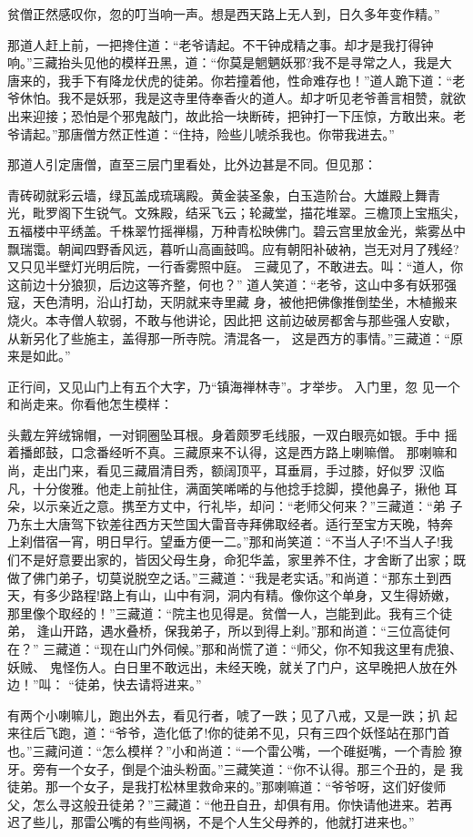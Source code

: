 贫僧正然感叹你，忽的叮当响一声。想是西天路上无人到，日久多年变作精。”

那道人赶上前，一把搀住道：“老爷请起。不干钟成精之事。却才是我打得钟
响。”三藏抬头见他的模样丑黑，道：“你莫是魍魉妖邪?我不是寻常之人，我是大
唐来的，我手下有降龙伏虎的徒弟。你若撞着他，性命难存也！”道人跪下道：“老
爷休怕。我不是妖邪，我是这寺里侍奉香火的道人。却才听见老爷善言相赞，就欲
出来迎接；恐怕是个邪鬼敲门，故此拾一块断砖，把钟打一下压惊，方敢出来。老
爷请起。”那唐僧方然正性道：“住持，险些儿唬杀我也。你带我进去。”

那道人引定唐僧，直至三层门里看处，比外边甚是不同。但见那：

青砖砌就彩云墙，绿瓦盖成琉璃殿。黄金装圣象，白玉造阶台。大雄殿上舞青
光，毗罗阁下生锐气。文殊殿，结采飞云；轮藏堂，描花堆翠。三檐顶上宝瓶尖，
五福楼中平绣盖。千株翠竹摇禅榻，万种青松映佛门。碧云宫里放金光，紫雾丛中
飘瑞霭。朝闻四野香风远，暮听山高画鼓鸣。应有朝阳补破衲，岂无对月了残经?
又只见半壁灯光明后院，一行香雾照中庭。
三藏见了，不敢进去。叫：“道人，你这前边十分狼狈，后边这等齐整，何也？”
道人笑道：“老爷，这山中多有妖邪强寇，天色清明，沿山打劫，天阴就来寺里藏
身，被他把佛像推倒垫坐，木植搬来烧火。本寺僧人软弱，不敢与他讲论，因此把
这前边破房都舍与那些强人安歇，从新另化了些施主，盖得那一所寺院。清混各一，
这是西方的事情。”三藏道：“原来是如此。”

正行间，又见山门上有五个大字，乃“镇海禅林寺”。才举步。入门里，忽
见一个和尚走来。你看他怎生模样：

头戴左笄绒锦帽，一对铜圈坠耳根。身着颇罗毛线服，一双白眼亮如银。手中
摇着播郎鼓，口念番经听不真。三藏原来不认得，这是西方路上喇嘛僧。
那喇嘛和尚，走出门来，看见三藏眉清目秀，额阔顶平，耳垂肩，手过膝，好似罗
汉临凡，十分俊雅。他走上前扯住，满面笑唏唏的与他捻手捻脚，摸他鼻子，揪他
耳朵，以示亲近之意。携至方丈中，行礼毕，却问：“老师父何来？”三藏道：“弟
子乃东土大唐驾下钦差往西方天竺国大雷音寺拜佛取经者。适行至宝方天晚，特奔
上刹借宿一宵，明日早行。望垂方便一二。”那和尚笑道：“不当人子!不当人子!我
们不是好意要出家的，皆因父母生身，命犯华盖，家里养不住，才舍断了出家；既
做了佛门弟子，切莫说脱空之话。”三藏道：“我是老实话。”和尚道：“那东土到西
天，有多少路程!路上有山，山中有洞，洞内有精。像你这个单身，又生得娇嫩，
那里像个取经的！”三藏道：“院主也见得是。贫僧一人，岂能到此。我有三个徒弟，
逢山开路，遇水叠桥，保我弟子，所以到得上刹。”那和尚道：“三位高徒何在？”
三藏道：“现在山门外伺候。”那和尚慌了道：“师父，你不知我这里有虎狼、妖贼、
鬼怪伤人。白日里不敢远出，未经天晚，就关了门户，这早晚把人放在外边！”叫：
“徒弟，快去请将进来。”

有两个小喇嘛儿，跑出外去，看见行者，唬了一跌；见了八戒，又是一跌；扒
起来往后飞跑，道：“爷爷，造化低了!你的徒弟不见，只有三四个妖怪站在那门首
也。”三藏问道：“怎么模样？”小和尚道：“一个雷公嘴，一个碓挺嘴，一个青脸
獠牙。旁有一个女子，倒是个油头粉面。”三藏笑道：“你不认得。那三个丑的，是
我徒弟。那一个女子，是我打松林里救命来的。”那喇嘛道：“爷爷呀，这们好俊师
父，怎么寻这般丑徒弟？”三藏道：“他丑自丑，却俱有用。你快请他进来。若再
迟了些儿，那雷公嘴的有些闯祸，不是个人生父母养的，他就打进来也。”


